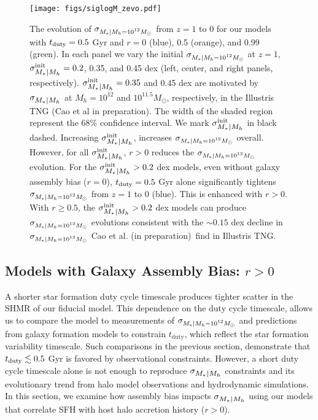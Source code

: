 \documentclass[12pt, letterpaper, preprint, tighten]{aastex62}
\newcommand{\cao}{Cao et al. (in preparation)}
\newcommand{\tduty}{t_{\rm duty}}
\newcommand{\siglogm}{\sigma_{\scaleto{M_*|M_h}{8pt}}}
\newcommand{\sigtwe}{\sigma_{\scaleto{M_*|M_h=10^{12}M_\odot}{8pt}}}
\begin{document}
\begin{figure}
\begin{center}
    \texttt{[image: figs/siglogM\_zevo.pdf]}
    \caption{The evolution of $\sigtwe$ from $z=1$ to 0 for our models with 
        $t_{\rm duty} = 0.5$ Gyr and $r = 0$ (blue), 0.5 (orange), and 0.99 (green). 
        In each panel we vary the initial $\sigtwe$ at $z=1$, $\siglogm^{\rm init} = 0.2$, 
        0.35, and 0.45 dex (left, center, and right panels, respectively). 
        $\siglogm^{\rm init} = 0.35$ and 0.45 dex are motivated by $\siglogm$ at 
        $M_h = 10^{12}$ and $10^{11.5}M_\odot$, respectively, in the Illustris TNG 
        (Cao et al in preparation). The width of the shaded region represent the $68\%$ 
        confidence interval. We mark $\siglogm^{\rm init}$ in black dashed. Increasing 
        $\siglogm^{\rm init}$, increases $\sigtwe$ overall. However, for all 
        $\siglogm^{\rm init}$, $r > 0$ reduces the $\sigtwe$ evolution. For the 
        $\siglogm^{\rm init}>0.2$ dex models, even without galaxy assembly bias ($r = 0$), 
        $\tduty = 0.5$ Gyr alone significantly tightens $\sigtwe$ from $z = 1$ to 0 (blue). 
        This is enhanced with $r > 0$. With $r \ge 0.5$, the $\siglogm^{\rm init} > 0.2$ dex 
        models can produce $\sigtwe$ evolutions consistent with the $\sim 0.15$ dex decline 
        in $\sigtwe$ \cao~find in Illustris TNG.}
    \label{fig:siglogM_zevo}
\end{center}
\end{figure}

\subsection{Models with Galaxy Assembly Bias: $r > 0$}
A shorter star formation duty cycle timescale produces tighter scatter in the
SHMR of our fiducial model. This dependence on the duty cycle timescale,
allows us to compare the model to measurements of $\sigtwe$ and predictions 
from galaxy formation models to constrain $t_\mathrm{duty}$, which reflect the 
star formation variability timescale. Such comparisons in the previous section, 
demonstrate that $t_{\rm duty} \lesssim 0.5$ Gyr is favored by observational 
constraints. However, a short duty cycle timescale alone is not enough to 
reproduce $\siglogm$ constraints and its evolutionary trend from halo model 
observations and hydrodynamic simulations. In this section, we examine how 
assembly bias impacts $\siglogm$ using our models that correlate SFH with host 
halo accretion history ($r > 0$).
\end{document}
